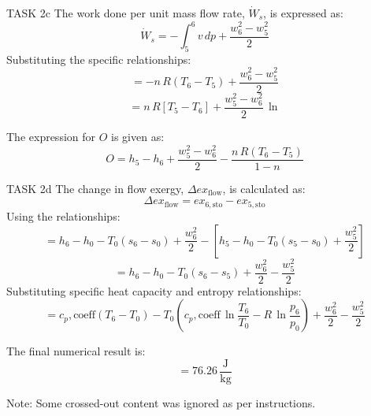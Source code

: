 TASK 2c  
The work done per unit mass flow rate, \( \dot{W}_s \), is expressed as:  
\[
\dot{W}_s = - \int_5^6 v \, dp + \frac{w_6^2 - w_5^2}{2}
\]  
Substituting the specific relationships:  
\[
= - n \, R \left( T_6 - T_5 \right) + \frac{w_6^2 - w_5^2}{2}
\]  
\[
= n \, R \left[ T_5 - T_6 \right] + \frac{w_5^2 - w_6^2}{2} \, \ln
\]  

The expression for \( O \) is given as:  
\[
O = h_5 - h_6 + \frac{w_5^2 - w_6^2}{2} - \frac{n \, R \left( T_6 - T_5 \right)}{1 - n}
\]  

TASK 2d  
The change in flow exergy, \( \Delta ex_{\text{flow}} \), is calculated as:  
\[
\Delta ex_{\text{flow}} = ex_{6,\text{sto}} - ex_{5,\text{sto}}
\]  
Using the relationships:  
\[
= h_6 - h_0 - T_0 \left( s_6 - s_0 \right) + \frac{w_6^2}{2} - \left[ h_5 - h_0 - T_0 \left( s_5 - s_0 \right) + \frac{w_5^2}{2} \right]
\]  
\[
= h_6 - h_0 - T_0 \left( s_6 - s_5 \right) + \frac{w_6^2}{2} - \frac{w_5^2}{2}
\]  
Substituting specific heat capacity and entropy relationships:  
\[
= c_p,\text{coeff} \left( T_6 - T_0 \right) - T_0 \left( c_p,\text{coeff} \, \ln \frac{T_6}{T_0} - R \, \ln \frac{p_6}{p_0} \right) + \frac{w_6^2}{2} - \frac{w_5^2}{2}
\]  

The final numerical result is:  
\[
= 76.26 \, \frac{\text{J}}{\text{kg}}
\]  

Note: Some crossed-out content was ignored as per instructions.